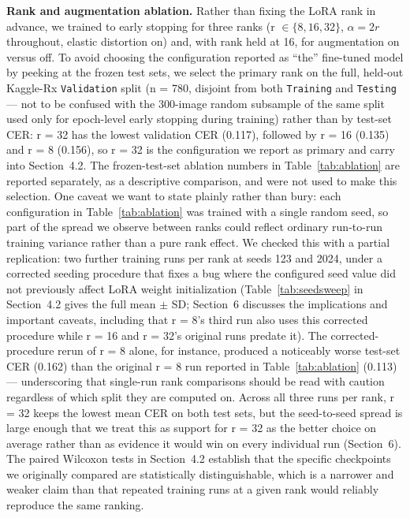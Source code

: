 \documentclass[12pt]{article}
\begin{document}
\textbf{Rank and augmentation ablation.} Rather than fixing the LoRA rank in advance, we trained to early
stopping for three ranks (r $\in \{8, 16, 32\}$, $\alpha = 2r$ throughout, elastic distortion on) and, with
rank held at 16, for augmentation on versus off. To avoid choosing the configuration reported as ``the''
fine-tuned model by peeking at the frozen test sets, we select the primary rank on the full, held-out
Kaggle-Rx \texttt{Validation} split (n = 780, disjoint from both \texttt{Training} and \texttt{Testing} ---
not to be confused with the 300-image random subsample of the same split used only for epoch-level early
stopping during training) rather than by test-set CER: r = 32 has the lowest validation CER (0.117),
followed by r = 16 (0.135) and r = 8 (0.156), so r = 32 is the configuration we report as primary and carry
into Section~4.2. The frozen-test-set ablation numbers in Table~\ref{tab:ablation} are reported separately,
as a descriptive comparison, and were not used to make this selection. One caveat we want to state plainly
rather than bury: each configuration in Table~\ref{tab:ablation} was trained with a single random seed, so
part of the spread we observe between ranks could reflect ordinary run-to-run training variance rather than
a pure rank effect. We checked this with a partial replication: two further training runs per rank at seeds
123 and 2024, under a corrected seeding procedure that fixes a bug where the configured seed value did not
previously affect LoRA weight initialization (Table~\ref{tab:seedsweep} in Section~4.2 gives the full mean
$\pm$ SD; Section~6 discusses the implications and important caveats, including that r = 8's third run also
uses this corrected procedure while r = 16 and r = 32's original runs predate it). The corrected-procedure
rerun of r = 8 alone, for instance, produced a noticeably worse test-set CER (0.162) than the original r = 8
run reported in Table~\ref{tab:ablation} (0.113) --- underscoring that single-run rank comparisons should be
read with caution regardless of which split they are computed on. Across all three runs per rank, r = 32
keeps the lowest mean CER on both test sets, but the seed-to-seed spread is large enough that we treat this
as support for r = 32 as the better choice on average rather than as evidence it would win on every
individual run (Section~6). The paired Wilcoxon tests in Section~4.2 establish
that the specific checkpoints we originally compared are statistically distinguishable, which is a narrower
and weaker claim than that repeated training runs at a given rank would reliably reproduce the same ranking.
\end{document}
